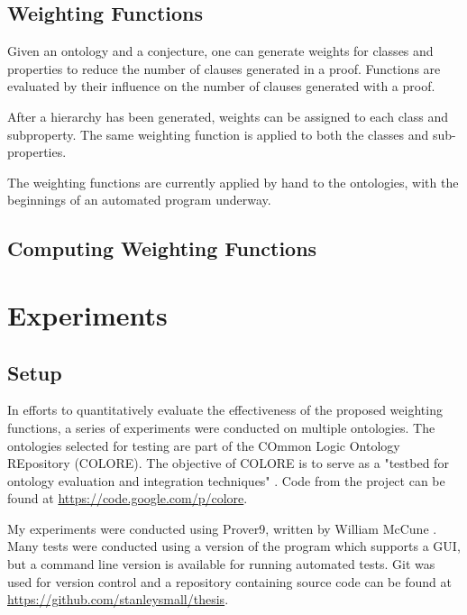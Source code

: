 \documentclass{article}
\begin{document}
		\subsection{Weighting Functions}
Given an ontology and a conjecture, one can generate weights for classes and properties to reduce the number of clauses generated in a proof. Functions are evaluated by their influence on the number of clauses generated with a proof. 

After a hierarchy has been generated, weights can be assigned to each class and subproperty. The same weighting function is applied to both the classes and sub-properties. 

The weighting functions are currently applied by hand to the ontologies, with the beginnings of an automated program underway. 

		\subsection{Computing Weighting Functions}

	\newpage
	\section{Experiments}

\subsection{Setup}
In efforts to quantitatively evaluate the effectiveness of the proposed weighting functions, a series of experiments were conducted on multiple ontologies. The ontologies selected for testing are part of the COmmon Logic Ontology REpository (COLORE). The objective of COLORE is to serve as a "testbed for ontology evaluation and integration techniques" \cite{gruninger2012specifying}. Code from the project can be found at \url{https://code.google.com/p/colore}. 

My experiments were conducted using Prover9, written by William McCune \cite{mccune2005prover9}. Many tests were conducted using a version of the program which supports a GUI, but a command line version is available for running automated tests. 
Git was used for version control and a repository containing source code can be found at \url{https://github.com/stanleysmall/thesis}.
\end{document}
